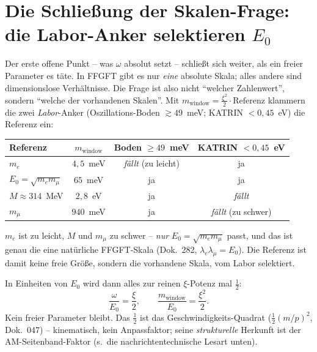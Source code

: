 \section{Die Schließung der Skalen-Frage: die Labor-Anker selektieren $E_0$}
Der erste offene Punkt -- was $\omega$ absolut setzt -- schließt sich weiter, als ein freier
Parameter es täte. In FFGFT gibt es nur \emph{eine} absolute Skala; alles andere sind dimensionslose
Verhältnisse. Die Frage ist also nicht \enquote{welcher Zahlenwert}, sondern \enquote{welche der
vorhandenen Skalen}. Mit $m_{\text{window}}=\tfrac{\xi^2}{2}\cdot\text{Referenz}$ klammern die zwei
\emph{Labor}-Anker (Oszillations-Boden $\gtrsim49$~meV; KATRIN $<0{,}45$~eV) die Referenz ein:
\begin{center}
\begin{tabular}{lccc}
\toprule
Referenz & $m_{\text{window}}$ & Boden $\ge49$~meV & KATRIN $<0{,}45$~eV \\
\midrule
$m_e$ & $4{,}5$~meV & \emph{fällt} (zu leicht) & ja \\
$E_0=\sqrt{m_e m_\mu}$ & $65$~meV & ja & ja \\
$M\approx314$~MeV & $2{,}8$~eV & ja & \emph{fällt} \\
$m_\mu$ & $940$~meV & ja & \emph{fällt} (zu schwer) \\
\bottomrule
\end{tabular}
\end{center}
$m_e$ ist zu leicht, $M$ und $m_\mu$ zu schwer -- \emph{nur} $E_0=\sqrt{m_e m_\mu}$ passt, und das ist
genau die eine natürliche FFGFT-Skala (Dok.~282, $\lambda_e\lambda_\mu=E_0$). Die Referenz ist damit
keine freie Größe, sondern die vorhandene Skala, vom Labor selektiert.

In Einheiten von $E_0$ wird dann alles zur reinen $\xi$-Potenz mal $\tfrac12$:
\begin{equation}
\frac{\omega}{E_0}=\frac{\xi}{2},\qquad \frac{m_{\text{window}}}{E_0}=\frac{\xi^2}{2}.
\end{equation}
Kein freier Parameter bleibt. Das $\tfrac12$ ist das Geschwindigkeits-Quadrat ($\tfrac12(m/p)^2$,
Dok.~047) -- kinematisch, kein Anpassfaktor; seine \emph{strukturelle} Herkunft ist der
AM-Seitenband-Faktor (s.\ die nachrichtentechnische Lesart unten).

